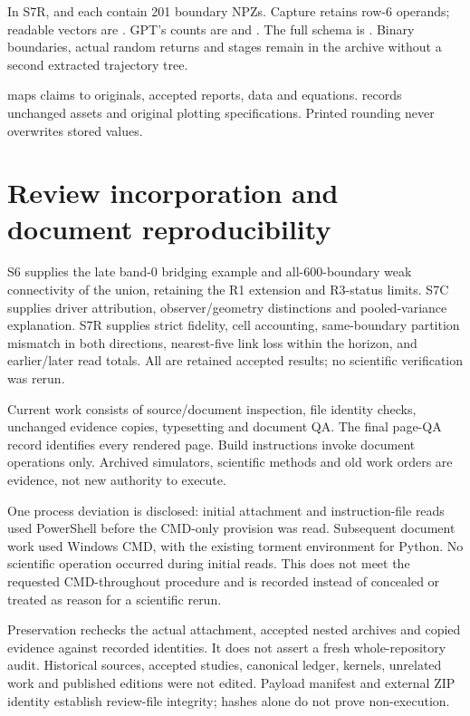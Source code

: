 In S7R, \protect{} and
\protect{} each contain 201 boundary NPZs.
Capture \protect{} retains row-6 operands; readable vectors are
\protect{}.
GPT's counts are \protect{} and
\protect{}.
The full schema is \protect{}.
Binary boundaries, actual random returns and stages remain in the archive without a second extracted trajectory tree.

\protect{} maps claims to originals, accepted reports, data and equations.
\protect{} records unchanged assets and original plotting specifications.
Printed rounding never overwrites stored values.

\section{Review incorporation and document reproducibility}\label{app:review}
S6 supplies the late band-0 bridging example and all-600-boundary weak connectivity of the union, retaining the R1 extension and R3-status limits. S7C supplies driver attribution, observer/geometry distinctions and pooled-variance explanation. S7R supplies strict fidelity, cell accounting, same-boundary partition mismatch in both directions, nearest-five link loss within the horizon, and earlier/later read totals. All are retained accepted results; no scientific verification was rerun.

Current work consists of source/document inspection, file identity checks, unchanged evidence copies, typesetting and document QA. The final page-QA record identifies every rendered page. Build instructions invoke document operations only. Archived simulators, scientific methods and old work orders are evidence, not new authority to execute.

One process deviation is disclosed: initial attachment and instruction-file reads used PowerShell before the CMD-only provision was read. Subsequent document work used Windows CMD, with the existing torment environment for Python. No scientific operation occurred during initial reads. This does not meet the requested CMD-throughout procedure and is recorded instead of concealed or treated as reason for a scientific rerun.

Preservation rechecks the actual attachment, accepted nested archives and copied evidence against recorded identities. It does not assert a fresh whole-repository audit. Historical sources, accepted studies, canonical ledger, kernels, unrelated work and published editions were not edited. Payload manifest and external ZIP identity establish review-file integrity; hashes alone do not prove non-execution.

